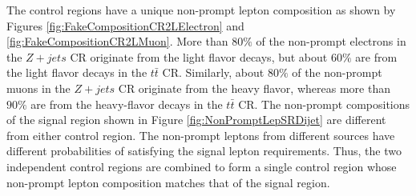 The control regions have a unique non-prompt lepton composition as shown by Figures \ref{fig:FakeCompositionCR2LElectron} and \ref{fig:FakeCompositionCR2LMuon}. More than $80\%$ of the non-prompt electrons in the $Z+jets$ CR originate from the light flavor decays, but about $60\%$ are from the light flavor decays in the $t\bar{t}$ CR. Similarly, about $80\%$ of the non-prompt muons in the $Z+jets$ CR originate from the heavy flavor, whereas more than $90\%$ are from the heavy-flavor decays in the $t\bar{t}$ CR. The non-prompt compositions of the signal region shown in Figure \ref{fig:NonPromptLepSRDijet} are different from either control region. The non-prompt leptons from different sources have different probabilities of satisfying the signal lepton requirements. Thus, the two independent control regions are combined to form a single control region whose non-prompt lepton composition matches that of the signal region. 
